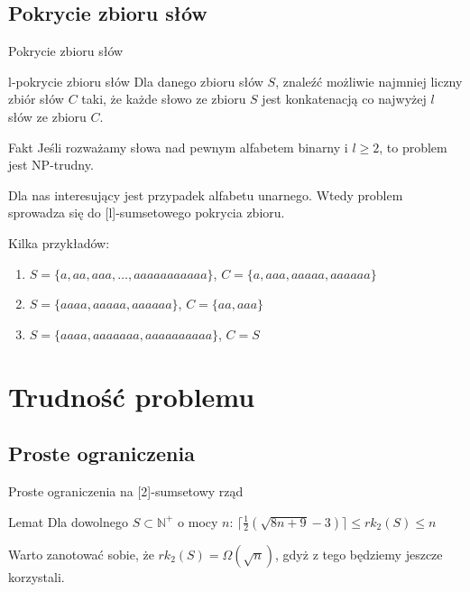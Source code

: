 \documentclass{beamer}
\newcommand{\N}{\mathbb{N}}
\begin{document}
	\subsection{Pokrycie zbioru słów}
		\begin{frame}{Pokrycie zbioru słów}

			\begin{alertblock}{l-pokrycie zbioru słów}
				Dla danego zbioru słów $ S $, znaleźć możliwie najmniej liczny zbiór słów $ C $ taki, że każde słowo ze zbioru $ S $ jest konkatenacją co najwyżej $ l $ słów ze zbioru $ C $.
			\end{alertblock}
			
			\pause
			\begin{exampleblock}{Fakt}
					Jeśli rozważamy słowa nad pewnym alfabetem binarny i $ l \geq 2 $, to problem jest NP-trudny.
			\end{exampleblock}
			
			\pause
			Dla nas interesujący jest przypadek alfabetu unarnego. Wtedy problem sprowadza się do [l]-sumsetowego pokrycia zbioru.
			
			Kilka przykładów:
            	\begin{enumerate}
				\pause \item $ S = \lbrace a,aa,aaa,\dots,aaaaaaaaaaa \rbrace $, $ C = \lbrace a,aaa,aaaaa,aaaaaa \rbrace $
				\pause \item $ S = \lbrace aaaa,aaaaa,aaaaaa \rbrace $, $ C = \lbrace aa,aaa \rbrace $
				\pause \item $ S = \lbrace aaaa,aaaaaaa,aaaaaaaaaa \rbrace $, $ C = S $
            \end{enumerate}
		\end{frame}
		
\section{Trudność problemu}
	\subsection{Proste ograniczenia}
		\begin{frame}{Proste ograniczenia na [2]-sumsetowy rząd}
            \begin{block}{Lemat}
			    Dla dowolnego $ S \subset \N^{+} $ o mocy $ n $:
                $ \lceil \frac{1}{2} ( \sqrt{8n + 9} - 3 ) \rceil \leq rk_2(S) \leq n $
            \end{block}
            
            \pause
            \vspace{\baselineskip}
            Warto zanotować sobie, że $ rk_2(S) = \Omega \left( \sqrt{n} \right) $, gdyż z tego będziemy jeszcze korzystali.
		\end{frame}
		
\end{document}
